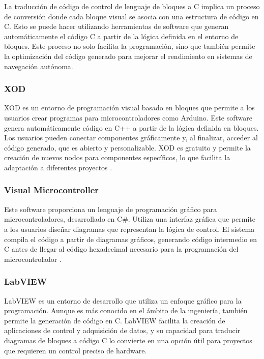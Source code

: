 La traducción de código de control de lenguaje de bloques a C implica un proceso de conversión donde cada bloque visual se asocia con una estructura de código 
en C. Esto se puede hacer utilizando herramientas de software que generan automáticamente el código C a partir de la lógica definida en el entorno de bloques. 
Este proceso no solo facilita la programación, sino que también permite la optimización del código generado para mejorar el rendimiento en sistemas de navegación 
autónoma.

\subsubsection{XOD}

XOD es un entorno de programación visual basado en bloques que permite a los usuarios crear programas para microcontroladores como Arduino. Este software 
genera automáticamente código en C++ a partir de la lógica definida en bloques. Los usuarios pueden conectar componentes gráficamente y, al finalizar, acceder 
al código generado, que es abierto y personalizable. XOD es gratuito y permite la creación de nuevos nodos para componentes específicos, lo que facilita la 
adaptación a diferentes proyectos \cite{Snchez2020ProgramacinDL}.

\subsubsection{Visual Microcontroller}
Este software proporciona un lenguaje de programación gráfico para microcontroladores, desarrollado en C\#. Utiliza una interfaz gráfica que permite a los 
usuarios diseñar diagramas que representan la lógica de control. El sistema compila el código a partir de diagramas gráficos, generando código intermedio 
en C antes de llegar al código hexadecimal necesario para la programación del microcontrolador \cite{Sacta2011DesarrolloDU}.


\subsubsection{LabVIEW}

LabVIEW es un entorno de desarrollo que utiliza un enfoque gráfico para la programación. Aunque es más conocido en el ámbito de la ingeniería, también 
permite la generación de código en C. LabVIEW facilita la creación de aplicaciones de control y adquisición de datos, y su capacidad para traducir 
diagramas de bloques a código C lo convierte en una opción útil para proyectos que requieren un control preciso de hardware.


